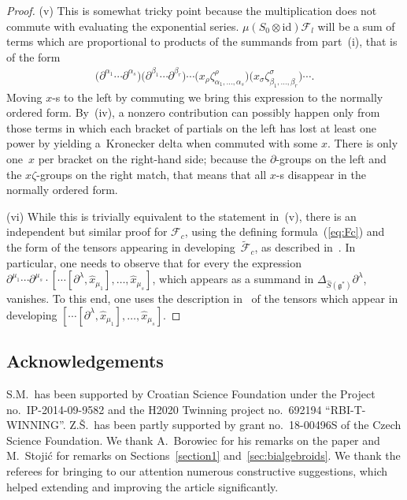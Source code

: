 \documentclass[pdftex]{sigma}
\def\gg{\mathfrak{g}}
\def\id{\mathrm{id}}
\numberwithin{equation}{section}
\begin{document}
\begin{proof}
(v) This is somewhat tricky point because the multiplication does not commute with eva\-luating the exponential series. $\mu(S_0\otimes\id)\mathcal{F}_l$ will be a sum of terms which are proportional to products of the summands from part~(i), that is of the form
\begin{gather*}\big(\partial^{\alpha_1}\cdots\partial^{\alpha_s}\big)\big(\partial^{\beta_1}\cdots\partial^{\beta_r}\big)\cdots \big(x_{\rho}\zeta^\rho_{\alpha_1,\dots,\alpha_s}\big)\big(x_{\sigma}\zeta^\sigma_{\beta_1,\dots,\beta_r}\big)\cdots.\end{gather*}
Moving $x$-s to the left by commuting we bring this expression to the normally ordered form. By~(iv), a nonzero contribution can possibly happen only from those terms in which each bracket of partials on the left has lost at least one power by yielding a~Kronecker delta when commuted with some $x$. There is only one~$x$ per bracket on the right-hand side; because the $\partial$-groups on the left and the $x\zeta$-groups on the right match, that means that all $x$-s disappear in the normally ordered form.

(vi) While this is trivially equivalent to the statement in~(v), there is an independent but similar proof for $\mathcal{F}_c$, using the defining formula~(\ref{eq:Fc}) and the form of the tensors appearing in developing~$\tilde{\mathcal{F}}_c$, as described in~\cite{scopr}. In particular, one needs to observe that for every  the expression $\partial^{\mu_1}\cdots\partial^{\mu_s}\cdot
[\cdots[\partial^\lambda,\hat{x}_{\mu_1}],\ldots,\hat{x}_{\mu_s}]$, which appears as a summand in $\Delta_{\hat{S}(\gg^*)}\partial^{\lambda}$, va\-ni\-shes. To this end, one uses the description in~\cite{scopr} of the tensors which appear in developing
$[\cdots[\partial^\lambda,\hat{x}_{\mu_1}],\dots,\hat{x}_{\mu_s}]$.
\end{proof}

\subsection*{Acknowledgements} S.M.~has been supported by Croatian Science Foundation under the Project no.~IP-2014-09-9582 and the H2020 Twinning project no.~692194 ``RBI-T-WINNING''. Z.\v{S}.~has been partly supported by grant no.~18-00496S of the Czech Science Foundation. We thank A.~Borowiec for his remarks on the paper and M.~Stoji\'c for remarks on Sections~\ref{section1} and~\ref{sec:bialgebroids}. We thank the referees for bringing to our attention numerous constructive suggestions, which helped extending and improving the article significantly.
\end{document}
